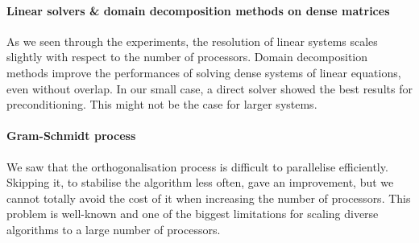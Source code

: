 \paragraph{Linear solvers \& domain decomposition methods on dense matrices}
As we seen through the experiments, the resolution of linear systems scales slightly with respect to the number of processors.
Domain decomposition methods improve the performances of solving dense systems of linear equations, even without overlap.
In our small case, a direct solver showed the best results for preconditioning.
This might not be the case for larger systems.

\paragraph{Gram-Schmidt process}
We saw that the orthogonalisation process is difficult to parallelise efficiently.
Skipping it, to stabilise the algorithm less often, gave an improvement, but we cannot totally avoid the cost of it when increasing the number of processors.
This problem is well-known and one of the biggest limitations for scaling diverse algorithms to a large number of processors.
